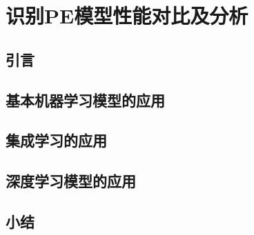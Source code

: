 \chapter{识别PE模型性能对比及分析}
\section{引言}
\section{基本机器学习模型的应用}
\section{集成学习的应用}
\section{深度学习模型的应用}
\section{小结}
